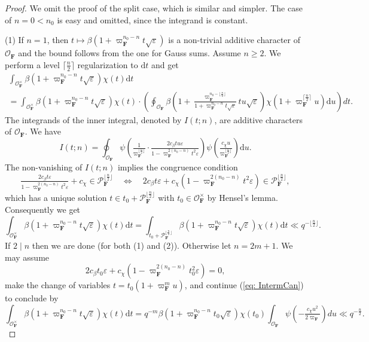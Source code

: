 \documentclass[A4]{amsart}
\def\geq{\geqslant}
\numberwithin{equation}{section} \everymath{\displaystyle}
\newcommand{\ud}{\mathrm{d}}
\newcommand{\F}{\mathbf{F}}
\newcommand{\vO}{\mathcal{O}}
\newcommand{\vP}{\mathcal{P}}
\begin{document}
\begin{proof}
	We omit the proof of the split case, which is similar and simpler. The case of $n=0<n_0$ is easy and omitted, since the integrand is constant.

\noindent (1) If $n=1$, then $t \mapsto \beta \left( 1+ \varpi_{\F}^{n_0-n} t \sqrt{\varepsilon} \right)$ is a non-trivial additive character of $\vO_{\F}$ and the bound follows from the one for Gauss sums. Assume $n \geq 2$. We perform a level $\lceil \tfrac{n}{2} \rceil$ regularization to $\ud t$ and get
\begin{multline*}
	\int_{\vO_{\F}^{\times}} \beta \left( 1+ \varpi_{\F}^{n_0-n} t \sqrt{\varepsilon} \right) \chi(t) \ud t \\
	= \int_{\vO_{\F}^{\times}} \beta \left( 1+ \varpi_{\F}^{n_0-n} t \sqrt{\varepsilon} \right) \chi(t) \cdot \left( \oint_{\vO_{\F}} \beta \left( 1 + \tfrac{\varpi_{\F}^{n_0-\lfloor \frac{n}{2} \rfloor}}{1+\varpi_{\F}^{n_0-n}t \sqrt{\varepsilon}} t u \sqrt{\varepsilon} \right) \chi(1+\varpi_{\F}^{\lceil \frac{n}{2} \rceil}u) \ud u \right) dt.
\end{multline*}
	The integrands of the inner integral, denoted by $I(t; n)$, are additive characters of $\vO_{\F}$. We have
	$$ I(t; n) = \oint_{\vO_{\F}} \psi \left( \tfrac{1}{\varpi_{\F}^{\lfloor \frac{n}{2} \rfloor}} \cdot \tfrac{2 c_{\beta} t u \varepsilon}{1-\varpi_{\F}^{2(n_0-n)} t^2 \varepsilon} \right) \psi \left( \tfrac{c_{\chi}u}{\varpi_{\F}^{\lfloor \frac{n}{2} \rfloor}} \right) \ud u. $$
	The non-vanishing of $I(t;n)$ implies the congruence condition
	$$ \tfrac{2 c_{\beta} t \varepsilon}{1-\varpi_{\F}^{2(n_0-n)} t^2 \varepsilon} + c_{\chi} \in \vP_{\F}^{\lfloor \frac{n}{2} \rfloor} \quad \Leftrightarrow \quad 2 c_{\beta} t \varepsilon + c_{\chi}(1-\varpi_{\F}^{2(n_0-n)} t^2 \varepsilon) \in \vP_{\F}^{\lfloor \frac{n}{2} \rfloor}, $$
	which has a unique solution $t \in t_0 + \vP_{\F}^{\lfloor \frac{n}{2} \rfloor}$ with $t_0 \in \vO_{\F}^{\times}$ by Hensel's lemma. Consequently we get
\begin{equation} \label{eq: IntermCan}
	\int_{\vO_{\F}^{\times}} \beta \left( 1+ \varpi_{\F}^{n_0-n} t \sqrt{\varepsilon} \right) \chi(t) \ud t = \int_{t_0 + \vP_{\F}^{\lfloor \frac{n}{2} \rfloor}} \beta \left( 1+ \varpi_{\F}^{n_0-n} t \sqrt{\varepsilon} \right) \chi(t) \ud t \ll q^{-\lfloor \frac{n}{2} \rfloor}.
\end{equation}
	If $2 \mid n$ then we are done (for both (1) and (2)). Otherwise let $n=2m+1$. We may assume
	$$ 2 c_{\beta} t_0 \varepsilon + c_{\chi}(1-\varpi_{\F}^{2(n_0-n)} t_0^2 \varepsilon) = 0, $$
	make the change of variables $t = t_0(1+\varpi_{\F}^m u)$, and continue (\ref{eq: IntermCan}) to conclude by
	$$ \int_{\vO_{\F}^{\times}} \beta \left( 1+ \varpi_{\F}^{n_0-n} t \sqrt{\varepsilon} \right) \chi(t) \ud t = q^{-m} \beta(1+ \varpi_{\F}^{n_0-n} t_0 \sqrt{\varepsilon}) \chi(t_0) \int_{\vO_{\F}} \psi \left( -\tfrac{c_{\chi}u^2}{2 \varpi_{\F}} \right) du \ll q^{-\frac{n}{2}}. $$
	

\end{proof}
\end{document}
